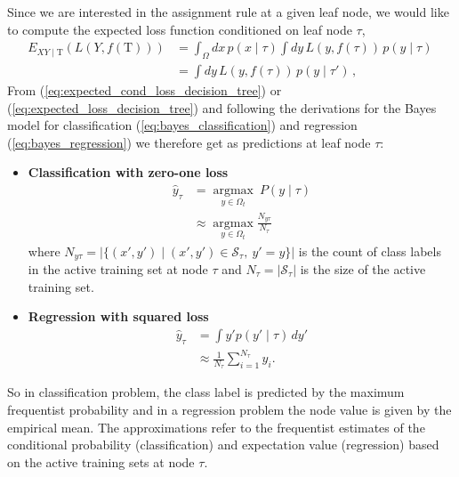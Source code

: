 \documentclass[12pt,a4paper]{article}
\begin{document}
Since we are interested in the assignment rule at a given leaf node,
we would like to compute the expected loss function conditioned on leaf node $\tau$, 
\begin{align}
E_{XY\mid\mathrm{T}} \left( L(Y, f(\mathrm{T})) \right) 
&=    \int_\Omega dx  \, p(x \mid  \tau ) \int dy\,L(y, f(\tau)) \, p(y \mid \tau)\,  \\
&=  \int dy\,L(y, f(\tau)) \, p(y \mid \tau')\,  
\label{eq:expected_cond_loss_decision_tree},
\end{align}
From (\ref{eq:expected_cond_loss_decision_tree}) or (\ref{eq:expected_loss_decision_tree}) and following the derivations for the Bayes model for classification (\ref{eq:bayes_classification}) and regression (\ref{eq:bayes_regression}) we therefore get as predictions at leaf node $\tau$:
\begin{itemize}\itemsep0em
	\item \textbf{Classification with zero-one loss}
	\begin{align} 
	\hat y_\tau &= \underset{y\in \Omega_t}{\operatorname{argmax}} ~ P(y\mid\tau) \label{eq:bayes_model_classification_dt}\\
	            &\approx
	            \underset{y\in \Omega_t}{\operatorname{argmax}}  \frac{N_{y\tau}}{N_\tau}  \label{approx:classification_tau}
	\end{align}
	where $N_{y\tau} = \lvert \{(x', y') \mid (x', y')  \in \mathcal S_\tau, ~ y'=y\}\rvert$ is the count of class labels in the active training set at node $\tau$ and
	$N_\tau =  \lvert \mathcal S_\tau \rvert$ is the size of the active training set.
	\item \textbf{Regression with squared loss}
	\begin{align}
	\hat y_\tau &= \int  y' p(y' \mid \tau)\, dy' \label{eq:bayes_model_regression_dt} \\ 
	 &\approx  \frac{1}{N_\tau} \sum_{i=1} ^{N_\tau}y_i.
	 \label{approx:regression_tau}
	\end{align}
\end{itemize}
So in classification problem, the class label is predicted by the maximum frequentist probability and in a regression problem the node value is given by the empirical mean.
The approximations refer to the frequentist estimates of the conditional probability (classification) and expectation value (regression) based on the active training sets at node $\tau$.
\end{document}
